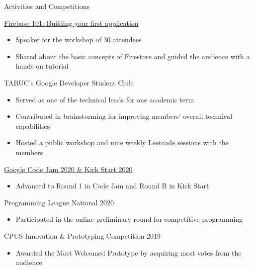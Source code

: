 \documentclass{article}
\newlength{\tabin}
\newlength{\secsep}
\newcommand{\lineunder}{\vspace*{-8pt} \\ \hspace*{-6pt} \hrulefill \\ \vspace*{-15pt}}
\newenvironment{tabbedsection}[1]{
  \begin{list}{}{
      \setlength{\itemsep}{0pt}
      \setlength{\labelsep}{0pt}
      \setlength{\labelwidth}{0pt}
      \setlength{\leftmargin}{\tabin}
      \setlength{\rightmargin}{\tabin}
      \setlength{\listparindent}{0pt}
      \setlength{\parsep}{0pt}
      \setlength{\parskip}{0pt}
      \setlength{\partopsep}{0pt}
      \setlength{\topsep}{#1}
    }
  \item[]
}{\end{list}}
\newenvironment{resume_section}[1]{
  \filbreak
  \vspace{2\secsep}
  \textsc{\large#1}
  \lineunder
  \begin{tabbedsection}{\secsep}
}{\end{tabbedsection}}
\newenvironment{resume_subsection}[2][]{
  \textbf{#2} \hfill {\footnotesize #1} \hspace{2em}
  \begin{tabbedsection}{0.5\secsep}
}{\end{tabbedsection}}
\newenvironment{subitems}{
  \renewcommand{\labelitemi}{-}
  \begin{itemize}
      \setlength{\labelsep}{1em}
}{\end{itemize}}
\begin{document}
\begin{resume_section}{Activities and Competitions}
    \begin{resume_subsection}[(January 2022)]{\href{https://www.youtube.com/watch?v=m5MLaNMbtjM&t}{Firebase 101: Building your first application}}
    \begin{subitems}
      \item Speaker for the workshop of 30 attendees
      \item Shared about the basic concepts of Firestore and guided the audience with a hands-on tutorial
    \end{subitems}
  \end{resume_subsection}

  \begin{resume_subsection}{{TARUC's Google Developer Student Club}}
    \begin{subitems}
      \item Served as one of the technical leads for one academic term
      \item Contributed in brainstorming for improving members' overall technical capabilities
      \item Hosted a public workshop and nine weekly Leetcode sessions with the members
    \end{subitems}
  \end{resume_subsection}

  \begin{resume_subsection}{\href{https://drive.google.com/drive/folders/1PXG8UBWxGFG66U_oSWwOouJDr8cWGGAu?usp=sharing}{Google Code Jam 2020 \& Kick Start 2020}}
    \begin{subitems}
      \item Advanced to Round 1 in Code Jam and Round B in Kick Start
    \end{subitems}
  \end{resume_subsection}

  \begin{resume_subsection}[(March 2020)]{Programming League National 2020}
    \begin{subitems}
      \item Participated in the online preliminary round for competitive programming
    \end{subitems}
  \end{resume_subsection}

  \begin{resume_subsection}[(March 2019)]{CPUS Innovation \& Prototyping Competition 2019}
    \begin{subitems}
      \item Awarded the Most Welcomed Prototype by acquiring most votes from the audience
    \end{subitems}
  \end{resume_subsection}
\end{resume_section}
\end{document}
